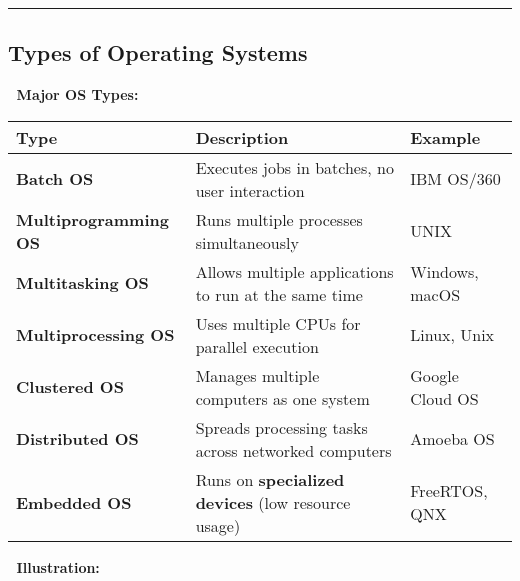 \documentclass[
]{article}
\makeatletter
\newcommand*\pandocbounded[1]{%
  \sbox\pandoc@box{#1}%
  \Gscale@div\@tempa{\textheight}{\dimexpr\ht\pandoc@box+\dp\pandoc@box\relax}%
  \Gscale@div\@tempb{\linewidth}{\wd\pandoc@box}%
  \ifdim\@tempb\p@<\@tempa\p@\let\@tempa\@tempb\fi%
  \ifdim\@tempa\p@<\p@\scalebox{\@tempa}{\usebox\pandoc@box}%
  \else\usebox{\pandoc@box}%
  \fi%
}
\makeatother
\begin{document}
\begin{center}\rule{0.5\linewidth}{0.5pt}\end{center}

\subsection{\texorpdfstring{\textbf{Types of Operating
Systems}}{Types of Operating Systems}}\label{types-of-operating-systems}

📌 \textbf{Major OS Types:}

\begin{longtable}[]{@{}
  >{\raggedright\arraybackslash}p{}
  >{\raggedright\arraybackslash}p{}
  >{\raggedright\arraybackslash}p{}@{}}
\toprule\noalign{}
\begin{minipage}[b]{\linewidth}\raggedright
\textbf{Type}
\end{minipage} & \begin{minipage}[b]{\linewidth}\raggedright
\textbf{Description}
\end{minipage} & \begin{minipage}[b]{\linewidth}\raggedright
\textbf{Example}
\end{minipage} \\
\midrule\noalign{}
\endhead
\bottomrule\noalign{}
\endlastfoot
\textbf{Batch OS} & Executes jobs in batches, no user interaction & IBM
OS/360 \\
\textbf{Multiprogramming OS} & Runs multiple processes simultaneously &
UNIX \\
\textbf{Multitasking OS} & Allows multiple applications to run at the
same time & Windows, macOS \\
\textbf{Multiprocessing OS} & Uses multiple CPUs for parallel execution
& Linux, Unix \\
\textbf{Clustered OS} & Manages multiple computers as one system &
Google Cloud OS \\
\textbf{Distributed OS} & Spreads processing tasks across networked
computers & Amoeba OS \\
\textbf{Embedded OS} & Runs on \textbf{specialized devices} (low
resource usage) & FreeRTOS, QNX \\
\end{longtable}

📌 \textbf{Illustration:}\\
\pandocbounded{\texttt{[image: Day\_2\_1.png]}}
\end{document}
